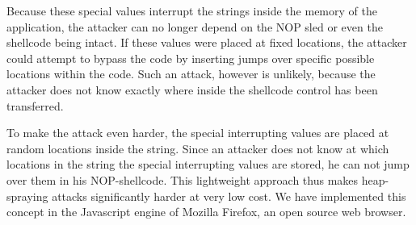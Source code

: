 Because these special values interrupt the strings inside the memory of the application, the attacker can no longer depend on the NOP sled or even the shellcode being intact. If these values were placed at fixed locations, the attacker could attempt to bypass the code by inserting jumps over specific possible locations within the code. Such an attack, however is unlikely, because the attacker does not know exactly where inside the shellcode control has been transferred.

To make the attack even harder, the special interrupting values are placed at random locations inside the string. Since an attacker does not know at which locations in the string the special interrupting values are stored, he can not jump over them in his NOP-shellcode. This lightweight approach thus makes heap-spraying attacks significantly harder at very low cost.
We have implemented this concept in the Javascript engine of Mozilla Firefox, an open source web browser.


